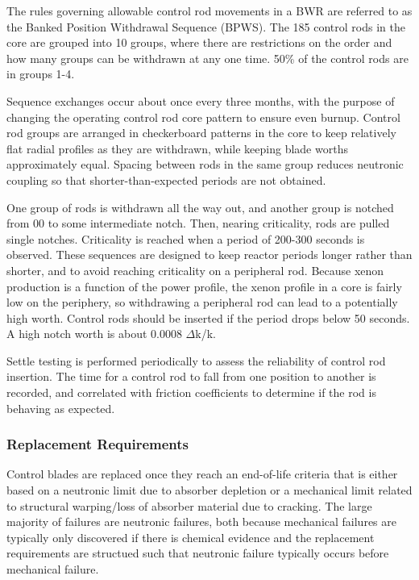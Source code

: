 \documentclass[10pt]{article}
\newcounter{subsubsubsection}[subsubsection]
\begin{document}
The rules governing allowable control rod movements in a BWR are referred to as the Banked Position Withdrawal Sequence (BPWS). The 185 control rods in the  core are grouped into 10 groups, where there are restrictions on the order and how many groups can be withdrawn at any one time. 50\% of the control rods are in groups 1-4. 



Sequence exchanges occur about once every three months, with the purpose of changing the operating control rod core pattern to ensure even burnup. Control rod groups are arranged in checkerboard patterns in the core to keep relatively flat radial profiles as they are withdrawn, while keeping blade worths approximately equal. Spacing between rods in the same group reduces neutronic coupling so that shorter-than-expected periods are not obtained. 


One group of rods is withdrawn all the way out, and another group is notched from 00 to some intermediate notch. Then, nearing criticality, rods are pulled single notches. Criticality is reached when a period of 200-300 seconds is observed. These sequences are designed to keep reactor periods longer rather than shorter, and to avoid reaching criticality on a peripheral rod. Because xenon production is a function of the power profile, the xenon profile in a core is fairly low on the periphery, so withdrawing a peripheral rod can lead to a potentially high worth. Control rods should be inserted if the period drops below 50 seconds. A high notch worth is about 0.0008 \(\Delta\)k/k. 



Settle testing is performed periodically to assess the reliability of control rod insertion. The time for a control rod to fall from one position to another is recorded, and correlated with friction coefficients to determine if the rod is behaving as expected. 



\subsubsection{Replacement Requirements}

Control blades are replaced once they reach an end-of-life criteria that is either based on a neutronic limit due to absorber depletion or a mechanical limit related to structural warping/loss of absorber material due to cracking. The large majority of failures are neutronic failures, both because mechanical failures are typically only discovered if there is chemical evidence and the replacement requirements are structued such that neutronic failure typically occurs before mechanical failure.
\end{document}
